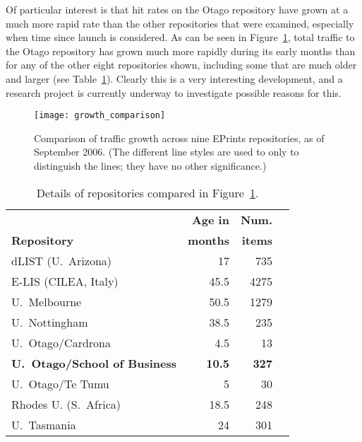 \documentclass[12pt,pdftex,a4paper,titlepage]{article}
\begin{document}
Of particular interest is that hit rates on the Otago repository have grown at a much more rapid rate than the other repositories that were examined, especially when time since launch is considered. As can be seen in Figure~\ref{fig-growth-comparison}, total traffic to the Otago repository has grown much more rapidly during its early months than for any of the other eight repositories shown, including some that are much older and larger (see Table~\ref{tab-reopsitories}). Clearly this is a very interesting development, and a research project is currently underway to investigate possible reasons for this.



\begin{figure}
	\centering
	\texttt{[image: growth\_comparison]}
	\caption{Comparison of traffic growth across nine EPrints repositories, as of September 2006. (The different line styles are used to only to distinguish the lines; they have no other significance.)}
	\label{fig-growth-comparison}
\end{figure}


\begin{table}
	\caption{Details of repositories compared in Figure~\ref{fig-growth-comparison}.}
	\label{tab-reopsitories}
	\begin{center}
		\begin{tabular}{lrrl}
													&	\textbf{Age in}	&	\textbf{Num.}	\\
			\textbf{Repository}						&	\textbf{months}	&	\textbf{items}	\\
			\hline
			dLIST (U.\ Arizona)						&	17				&	735	\\
			E-LIS (CILEA, Italy)					&	45.5			&	4275	\\
			U.\ Melbourne							&	50.5			&	1279	\\
			U.\ Nottingham							&	38.5			&	235	\\
			U.\ Otago/Cardrona						&	4.5				&	13	\\
			\textbf{U.\ Otago/School of Business}	&	\textbf{10.5}	&	\textbf{327}	\\
			U.\ Otago/Te Tumu						&	5				&	30	\\
			Rhodes U. (S.\ Africa)					&	18.5			&	248	\\
			U.\ Tasmania							&	24				&	301	\\
		\end{tabular}
	\end{center}
\end{table}
\end{document}
